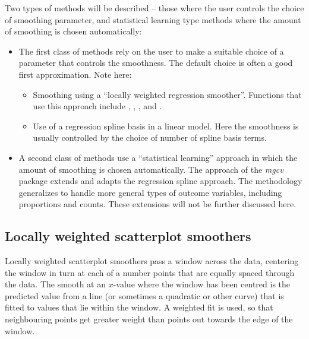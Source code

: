 Two types of methods will be described -- those where the user
controls the choice of smoothing parameter, and statistical learning
type methods where the amount of smoothing is chosen automatically:
\begin{itemize}
\item The first class of methods rely on the user to make a suitable
  choice of a parameter that controls the smoothness.  The default
choice is often a good first approximation.  Note here:
\begin{itemize}
\item Smoothing using a ``locally weighted regression
smoother''.
Functions that use this approach include , ,
, and .
\item Use of a regression spline basis in a linear model.  Here the smoothness
is usually controlled by the choice of number of spline basis terms.
\end{itemize}
\item A second class of methods use a ``statistical learning''
  approach in which the amount of smoothing is chosen automatically.
  The approach of the \textit{mgcv} package extends and adapts the
  regression spline approach.  The methodology
  generalizes to handle more general types of outcome variables,
  including proportions and counts.  These extensions will not be
  further discussed here.
\end{itemize}

\subsection{Locally weighted scatterplot smoothers}

Locally weighted scatterplot smoothers pass a window across
the data, centering the window in turn at each of a number points that
are equally spaced through the data. The smooth at an $x$-value where
the window has been centred is the predicted value from a line (or
sometimes a quadratic or other curve) that is fitted to values that
lie within the window. A weighted fit is used, so that neighbouring
points get greater weight than points out towards the edge of the
window.

